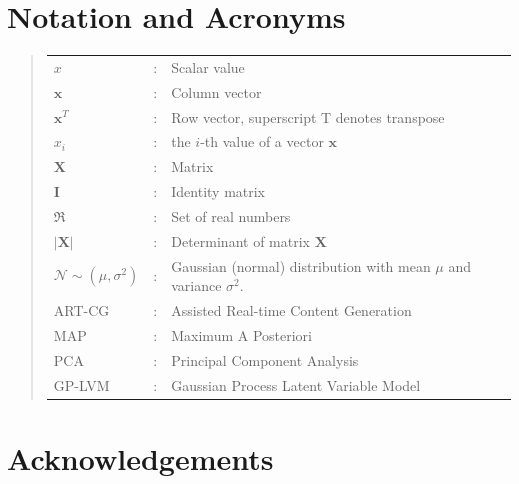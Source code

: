 \documentclass[ %
author={Dillon Keith Diep},
supervisor={Dr. Carl Henrik Ek},
degree={MEng},
title={ART-CG Hair:},
subtitle={Assisted Real-time Content Generation of Stylised Virtual Hair},
type={Research},
year={2017} ]{dissertation}
\begin{document}

\chapter*{Notation and Acronyms}

\begin{quote}
	\noindent
	\begin{tabular}{lcl}
		$x$                 &:	& Scalar value\\
		$\bm{x}$            &:	& Column vector\\
		$\bm{x}^T$			&:	& Row vector, superscript T denotes transpose\\
		$x_i$               &:  & the $i$-th value of a vector $\bm{x}$\\
		$\bm{X}$			&:	& Matrix\\
		$\bm{I}$ 			&:	& Identity matrix\\
		$\Re$				&:	& Set of real numbers\\
		$|\bm{X}|$			&:	& Determinant of matrix $\bm{X}$\\	
		$\mathcal{N}\sim(\mu, \sigma^2)$ 			&:	& Gaussian (normal) distribution with mean $\mu$ and variance $\sigma^2$.\\
		ART-CG				&:	& Assisted Real-time Content Generation\\
		MAP					&:	& Maximum A Posteriori\\
		PCA		 			&:	& Principal Component Analysis\\
		GP-LVM	 			&:	& Gaussian Process Latent Variable Model\\
	\end{tabular}
\end{quote}


\chapter*{Acknowledgements}


\noindent

\end{document}
